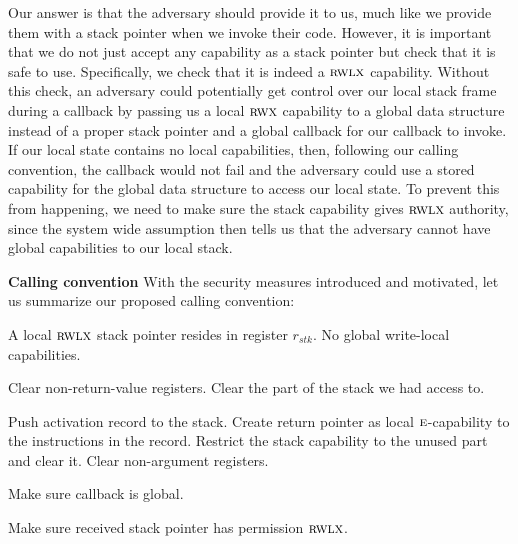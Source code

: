 \documentclass[acmsmall,review]{acmart}\settopmatter{printfolios=true}
\newcommand{\var}[1]{\mathit{#1}}
\newcommand{\stk}{\var{stk}}
\newcommand{\plainperm}[1]{\textsc{#1}}
\newcommand{\entry}{\plainperm{e}}
\newcommand{\rwx}{\plainperm{rwx}}
\newcommand{\rwlx}{\plainperm{rwlx}}
\begin{document}
Our answer is that the adversary should provide it to us, much like we provide
them with a stack pointer when we invoke their code. However, it is important
that we do not just accept any capability as a stack pointer but check that it
is safe to use. Specifically, we check that it is indeed a $\rwlx$ capability. Without
this check, an adversary could potentially get control over our local stack
frame during a callback by passing us a local $\rwx$ capability to a global data
structure instead of a proper stack pointer
and a global callback for our callback to invoke. If our local state contains no
local capabilities, then, following our calling convention, the callback would
not fail and the adversary could use a stored capability for the global data
structure to access our local state. To prevent this from happening, we need to
make sure the stack capability gives $\rwlx$ authority, since the system wide assumption then
tells us that the adversary cannot have global capabilities to our local stack.

\textbf{Calling convention} With the security measures introduced and motivated,
let us summarize our proposed calling convention:
\begin{description}[font=\normalfont\itshape]
\item[At program start-up] A local $\rwlx$ stack pointer resides in register $r_\stk$. No global write-local capabilities.
\item[Before returning to the adversary] Clear non-return-value registers. Clear the part of the stack we had access to.
\item[Before invoking the adversary] Push activation record to the stack. Create
  return pointer as local $\entry$-capability to the instructions in the record.
  Restrict the stack capability to the unused part and clear it. Clear
  non-argument registers.
\item[Before invoking an adversary callback] Make sure callback is global.
\item[When invoked by an adversary] Make sure received stack pointer has permission $\rwlx$.
\end{description}
\end{document}
